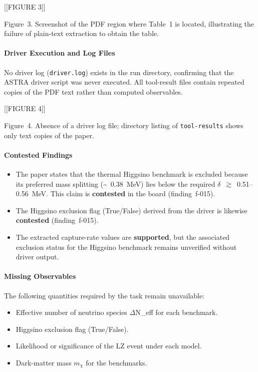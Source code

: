 \documentclass[11pt,a4paper]{article}
\begin{document}
[[FIGURE 3]]

Figure~3. Screenshot of the PDF region where Table~1 is located, illustrating the failure of plain-text extraction to obtain the table.

\paragraph{Driver Execution and Log Files}
No driver log (\texttt{driver.log}) exists in the run directory, confirming that the ASTRA driver script was never executed. All tool-result files contain repeated copies of the PDF text rather than computed observables.


[[FIGURE 4]]

Figure~4. Absence of a driver log file; directory listing of \texttt{tool-results} shows only text copies of the paper.

\paragraph{Contested Findings}
\begin{itemize}
  \item The paper states that the thermal Higgsino benchmark is excluded because its preferred mass splitting (\textasciitilde{}~0.38~MeV) lies below the required $\delta$~$\gtrsim$~0.51--0.56~MeV. This claim is \textbf{contested} in the board (finding~f-015).
  \item The Higgsino exclusion flag (True/False) derived from the driver is likewise \textbf{contested} (finding~f-015).
  \item The extracted capture-rate values are \textbf{supported}, but the associated exclusion status for the Higgsino benchmark remains unverified without driver output.
\end{itemize}
\paragraph{Missing Observables}
The following quantities required by the task remain unavailable:

\begin{itemize}
  \item Effective number of neutrino species $\Delta$N\_eff for each benchmark.
  \item Higgsino exclusion flag (True/False).
  \item Likelihood or significance of the LZ event under each model.
  \item Dark-matter mass $m_\chi$ for the benchmarks.
\end{itemize}
\end{document}
